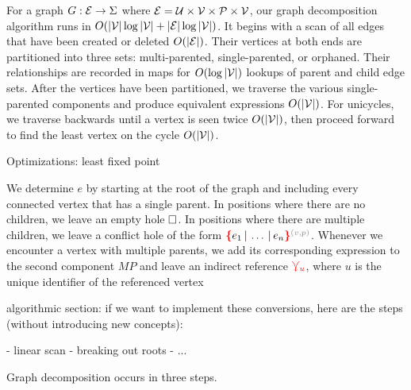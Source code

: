 

For a graph $G : \mathcal{E} \to \Sigma$ where $\mathcal{E} = \mathcal{U} \times \mathcal{V} \times \mathcal{P} \times \mathcal{V}$, our graph decomposition algorithm runs in $O(\left\lvert\mathcal{V}\right\rvert \log \left\lvert\mathcal{V}\right\rvert + \left\lvert\mathcal{E}\right\rvert \log \left\lvert\mathcal{V}\right\rvert)$.
It begins with a scan of all edges that have been created or deleted $O(\left\lvert\mathcal{E}\right\rvert)$.
Their vertices at both ends are partitioned into three sets: multi-parented, single-parented, or orphaned.
Their relationships are recorded in maps for $O(\log \left\lvert\mathcal{V}\right\rvert)$ lookups of parent and child edge sets.
After the vertices have been partitioned, we traverse the various single-parented components and produce equivalent expressions $O(\left\lvert\mathcal{V}\right\rvert)$.
For unicycles, we traverse backwards until a vertex is seen twice $O(\left\lvert\mathcal{V}\right\rvert)$, then proceed forward to find the least vertex on the cycle $O(\left\lvert\mathcal{V}\right\rvert)$.


Optimizations: least fixed point


We determine $e$ by starting at the root of the graph and including every connected
vertex that has a single parent. In positions where there are no children, we
leave an empty hole $\square$. In positions where there are multiple children, we
leave a conflict hole of the form $\conflictHole{e_1,\ldots,e_n}{v}{p}$. Whenever we
encounter a vertex with multiple parents, we add its corresponding expression to
the second component $MP$ and leave an indirect reference $\textcolor{red}{\curlyveedownarrow_{u}}$, where $u$ is
the unique identifier of the referenced vertex


algorithmic section: if we want to implement these conversions, here are the
steps (without introducing new concepts):

- linear scan
- breaking out roots
- ...

Graph decomposition occurs in three steps.



